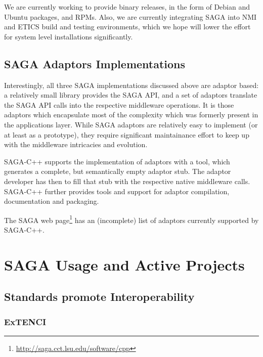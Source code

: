 \documentclass[12pt]{article}
\begin{document}
   We are currently working to provide binary releases, in the form of
   Debian and Ubuntu packages, and RPMs.  Also, we are currently
   integrating SAGA into NMI and ETICS build and testing environments,
   which we hope will lower the effort for system level installations
   significantly.


 \subsection{SAGA Adaptors Implementations}
 \label{ssec:adaptors}

  Interestingly, all three SAGA implementations discussed above are
  adaptor based: a relatively small library provides the SAGA API, and
  a set of adaptors translate the SAGA API calls into the respective
  middleware operations.  It is those adaptors which encapsulate most
  of the complexity which was formerly present in the applications
  layer.  While SAGA adaptors are relatively easy to implement (or at
  least as a prototype), they require significant maintainance effort
  to keep up with the middleware intricacies and evolution.

  SAGA-C++ supports the implementation of adaptors with a tool, which
  generates a complete, but semantically empty adaptor stub.  The
  adaptor developer has then to fill that stub with the respective
  native middleware calls.  SAGA-C++ further provides tools and
  support for adaptor compilation, documentation and packaging.

  The SAGA web
  page\footnote{\url{http://saga.cct.lsu.edu/software/cpp}} has an
  (incomplete) list of adaptors currently supported by SAGA-C++.
  

\section{SAGA Usage and Active Projects}


\subsection{Standards promote Interoperability}

 \subsubsection*{ExTENCI}
\end{document}
